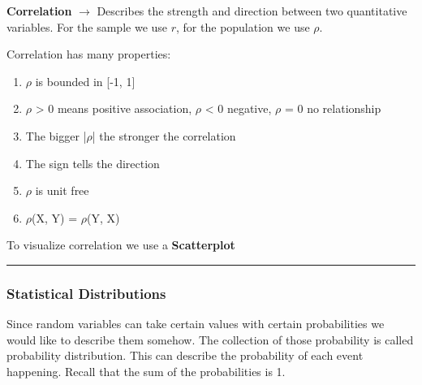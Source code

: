 \vspace{10pt}

\textbf{Correlation} $\xrightarrow{}$ Describes the strength and direction between two quantitative variables. For the sample we use $r$, for the population we use $\rho$.

\vspace{10pt}

Correlation has many properties:
\begin{enumerate}
    \item $\rho$ is bounded in [-1, 1]
    \item $\rho$ > 0 means positive association, $\rho$ < 0 negative, $\rho$ = 0 no relationship
    \item The bigger |$\rho$| the stronger the correlation
    \item The sign tells the direction
    \item $\rho$ is unit free
    \item $\rho$(X, Y) = $\rho$(Y, X)
    
\end{enumerate}

To visualize correlation we use a \textbf{Scatterplot}



\hrule

\subsubsection{Statistical Distributions}

\vspace{10pt}

Since random variables can take certain values with certain probabilities we would like to describe them somehow. The collection of those probability is called probability distribution. This can describe the probability of each event happening. Recall that the sum of the probabilities is 1.


